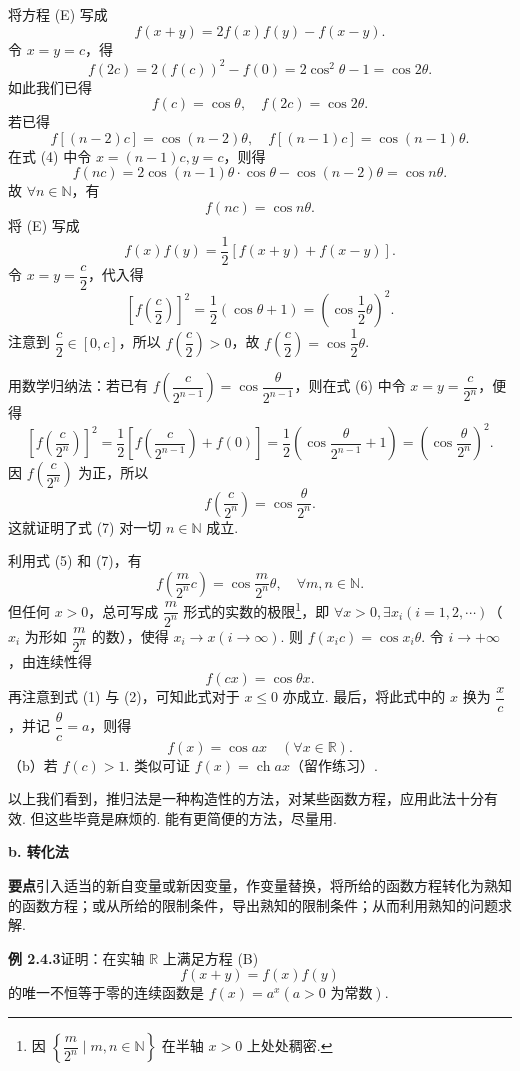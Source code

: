 \documentclass[UTF8, 12pt, fontset=fandol, oneside]{ctexart}
\begin{document}
将方程 (E) 写成
\[
  f(x+y)=2f(x)f(y)-f(x-y). \tag{4}
\]
令 $x=y=c$，得
\[
  f(2c)=2(f(c))^2-f(0)=2\cos^2\theta-1=\cos2\theta.
\]
如此我们已得
\[
  f(c)=\cos\theta,\quad f(2c)=\cos2\theta.
\]
若已得
\[
  f[(n-2)c]=\cos(n-2)\theta,\quad f[(n-1)c]=\cos(n-1)\theta.
\]
在式 (4) 中令 $x=(n-1)c,y=c$，则得
\[
  f(nc)=2\cos(n-1)\theta\cdot\cos\theta-\cos(n-2)\theta=\cos n\theta.
\]
故 $\forall n\in\mathbb{N}$，有
  \[
    f(nc)=\cos n\theta. \tag{5}
  \]
将 (E) 写成
\[
  f(x)f(y)=\frac12[f(x+y)+f(x-y)]. \tag{6}
\]
令 $x=y=\dfrac c2$，代入得
\[
  \left[f\left(\frac c2\right)\right]^2=\frac12(\cos\theta+1)=\left(\cos\frac12\theta\right)^2.
\]
注意到 $\dfrac c2\in[0,c]$，所以 $f\left(\dfrac c2\right)>0$，故 $f\left(\dfrac c2\right)=\cos\dfrac12\theta$.

用数学归纳法：若已有 $f\left(\dfrac c{2^{n-1}}\right)=\cos\dfrac{\theta}{2^{n-1}}$，则在式 (6) 中令 $x=y=\dfrac c{2^n}$，便得
\[
  \left[f\left(\frac c{2^n}\right)\right]^2
  =\frac12\left[f\left(\frac c{2^{n-1}}\right)+f(0)\right]
  =\frac12\left(\cos\frac{\theta}{2^{n-1}}+1\right)
  =\left(\cos\frac{\theta}{2^n}\right)^2.
\]
因 $f\left(\dfrac c{2^n}\right)$ 为正，所以
\[
  f\left(\frac c{2^n}\right)=\cos\frac{\theta}{2^n}. \tag{7}
\]
这就证明了式 (7) 对一切 $n\in\mathbb{N}$ 成立.

利用式 (5) 和 (7)，有
\[
  f\left(\frac m{2^n}c\right)=\cos\frac m{2^n}\theta,\quad \forall m,n\in\mathbb{N}. \tag{8}
\]
但任何 $x>0$，总可写成 $\dfrac m{2^n}$ 形式的实数的极限\footnote{因 $\left\{\dfrac m{2^n}\mid m,n\in\mathbb{N}\right\}$ 在半轴 $x>0$ 上处处稠密.}，即 $\forall x>0,\exists x_i(i=1,2,\cdots)$（$x_i$ 为形如 $\dfrac m{2^n}$ 的数），使得 $x_i\to x(i\to\infty)$. 则 $f(x_ic)=\cos x_i\theta$. 令 $i\to+\infty$，由连续性得
\[
  f(cx)=\cos\theta x.
\]
再注意到式 (1) 与 (2)，可知此式对于 $x\le0$ 亦成立. 最后，将此式中的 $x$ 换为 $\dfrac xc$，并记 $\dfrac\theta c=a$，则得
\[
  f(x)=\cos ax\quad(\forall x\in\mathbb{R}).
\]
（b）若 $f(c)>1$. 类似可证 $f(x)=\operatorname{ch} ax$（留作练习）.

以上我们看到，推归法是一种构造性的方法，对某些函数方程，应用此法十分有效. 但这些毕竟是麻烦的. 能有更简便的方法，尽量用.

\noindent\textbf{b. 转化法}

\noindent\textbf{要点}\quad 引入适当的新自变量或新因变量，作变量替换，将所给的函数方程转化为熟知的函数方程；或从所给的限制条件，导出熟知的限制条件；从而利用熟知的问题求解.

\noindent\textbf{例 2.4.3}\quad 证明：在实轴 $\mathbb{R}$ 上满足方程 (B)
\[
  f(x+y)=f(x)f(y)
\]
的唯一不恒等于零的连续函数是 $f(x)=a^x(a>0\text{ 为常数})$.
\end{document}
